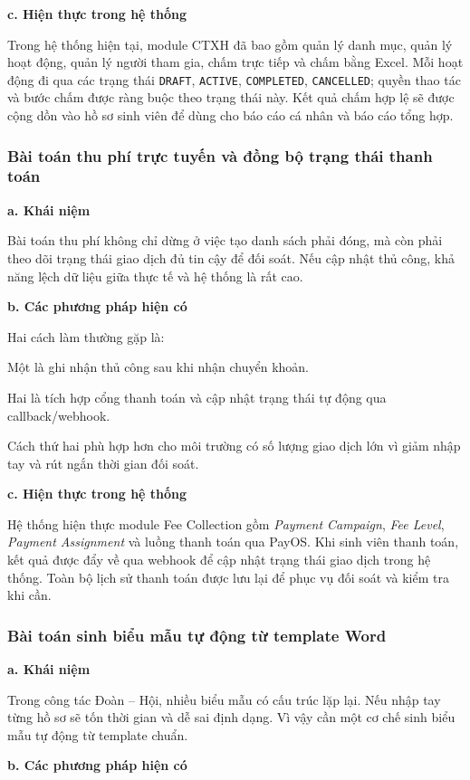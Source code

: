 \textbf{c. Hiện thực trong hệ thống}

Trong hệ thống hiện tại, module CTXH đã bao gồm quản lý danh mục, quản lý hoạt động, quản lý người tham gia, chấm trực tiếp và chấm bằng Excel. Mỗi hoạt động đi qua các trạng thái \texttt{DRAFT}, \texttt{ACTIVE}, \texttt{COMPLETED}, \texttt{CANCELLED}; quyền thao tác và bước chấm được ràng buộc theo trạng thái này. Kết quả chấm hợp lệ sẽ được cộng dồn vào hồ sơ sinh viên để dùng cho báo cáo cá nhân và báo cáo tổng hợp.

\subsubsection{Bài toán thu phí trực tuyến và đồng bộ trạng thái thanh toán}
\textbf{a. Khái niệm}

Bài toán thu phí không chỉ dừng ở việc tạo danh sách phải đóng, mà còn phải theo dõi trạng thái giao dịch đủ tin cậy để đối soát. Nếu cập nhật thủ công, khả năng lệch dữ liệu giữa thực tế và hệ thống là rất cao.

\textbf{b. Các phương pháp hiện có}

Hai cách làm thường gặp là:

Một là ghi nhận thủ công sau khi nhận chuyển khoản.

Hai là tích hợp cổng thanh toán và cập nhật trạng thái tự động qua callback/webhook.

Cách thứ hai phù hợp hơn cho môi trường có số lượng giao dịch lớn vì giảm nhập tay và rút ngắn thời gian đối soát.

\textbf{c. Hiện thực trong hệ thống}

Hệ thống hiện thực module Fee Collection gồm \textit{Payment Campaign}, \textit{Fee Level}, \textit{Payment Assignment} và luồng thanh toán qua PayOS. Khi sinh viên thanh toán, kết quả được đẩy về qua webhook để cập nhật trạng thái giao dịch trong hệ thống. Toàn bộ lịch sử thanh toán được lưu lại để phục vụ đối soát và kiểm tra khi cần.

\subsubsection{Bài toán sinh biểu mẫu tự động từ template Word}
\textbf{a. Khái niệm}

Trong công tác Đoàn -- Hội, nhiều biểu mẫu có cấu trúc lặp lại. Nếu nhập tay từng hồ sơ sẽ tốn thời gian và dễ sai định dạng. Vì vậy cần một cơ chế sinh biểu mẫu tự động từ template chuẩn.

\textbf{b. Các phương pháp hiện có}

